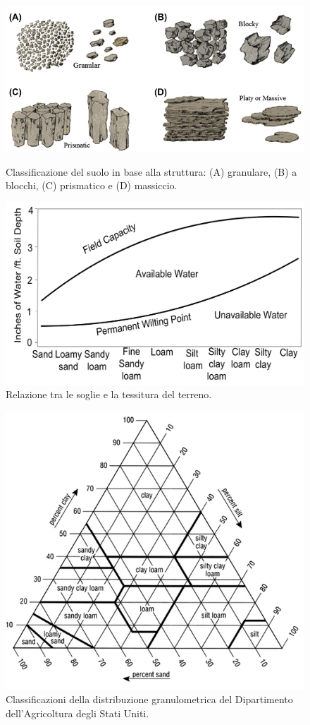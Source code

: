 \documentclass[12pt,a4paper,openright,twoside, openany]{book}
\begin{document}
\begin{figure}[ht]
    \centering
    \begin{minipage}[t]{0.5\textwidth}
        \vfill
        \includegraphics[width=\linewidth]{./figures/soil-structure.png}
        \caption{Classificazione del suolo in base alla struttura: (A) granulare, (B) a blocchi, (C) prismatico e (D) massiccio\cite{RAI2017505}.}
        \label{fig.soil-structure}
    \end{minipage}
    \hfill
    \begin{minipage}[t]{0.45\textwidth}
        \vfill
        \includegraphics[width=\linewidth]{./figures/SWC-costants-in-different-soils.png}
        \caption{Relazione tra le soglie e la tessitura del terreno\cite{Ding2022}.}
        \label{fig.SWC-costants-in-different-soils}
    \end{minipage}
\end{figure}

\begin{figure}[ht]
    \centering\includegraphics[width=0.52\linewidth]{./figures/soil-texture.png}\caption{Classificazioni della distribuzione granulometrica del Dipartimento dell'Agricoltura degli Stati Uniti\cite{RAI2017505}.}\label{fig.soil-texture}
\end{figure}
\newpage
\end{document}
